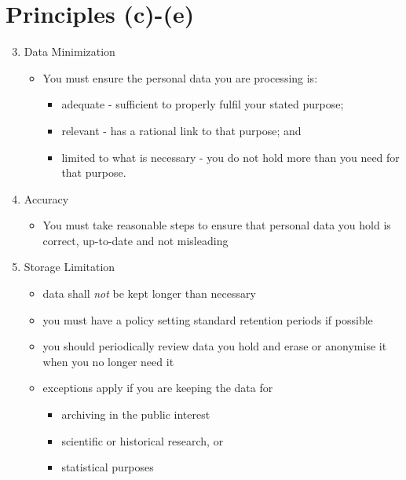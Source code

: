 \documentclass{article}
\begin{document}
\section{Principles (c)-(e)}
\begin{enumerate}[label=\alph*]
\setcounter{enumi}{2}
\item Data Minimization 
\begin{itemize}
\item You must ensure the personal data you are processing is:
\begin{itemize}
\item adequate - sufficient to properly fulfil your stated purpose;
\item relevant - has a rational link to that purpose; and
\item limited to what is necessary - you do not hold more than you need for that purpose.
\end{itemize}
\end{itemize}
\item Accuracy
\begin{itemize}
\item You must take reasonable steps to ensure that personal data you hold is correct, up-to-date and not misleading
\end{itemize}

\item Storage Limitation
\begin{itemize}
\item data shall {\em not} be kept longer than necessary
\item you must have a policy setting standard retention periods if possible 
\item you should periodically review data you hold and erase or anonymise it when you no longer need it
\item exceptions apply if you are keeping the data for
\begin{itemize}
\item archiving in the public interest
\item scientific or historical research, or
\item statistical purposes
\end{itemize}
\end{itemize}
\end{enumerate}
\end{document}
